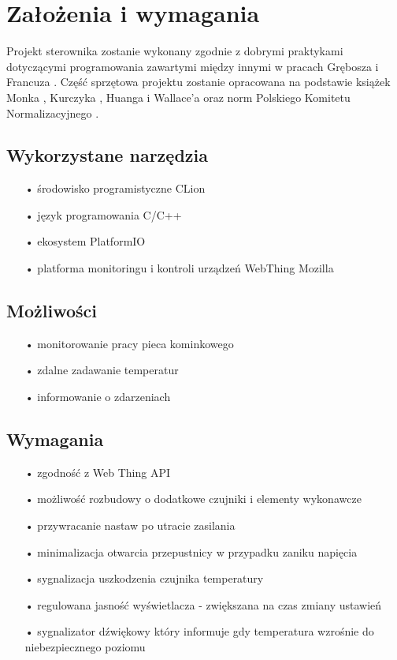 \documentclass[11pt]{report}
\begin{document}
 \section{Założenia i wymagania}
 Projekt sterownika zostanie wykonany zgodnie z dobrymi praktykami dotyczącymi programowania zawartymi między innymi w pracach Grębosza \cite{Grebosz2018} i Francuza \cite{Francuz2015}. Część sprzętowa projektu zostanie opracowana na podstawie książek Monka \cite{Monk2014} \cite{Monk2014a} \cite{Monk2018}, Kurczyka \cite{Kurczyk2019}, Huanga \cite{Huang2018} i Wallace'a \cite{Wallace2019} oraz norm Polskiego Komitetu Normalizacyjnego \cite{PKN1999} \cite{PKN2000}.
 
 \subsection{Wykorzystane narzędzia}
 \begin{enumerate}
 \item[•] środowisko programistyczne CLion
 \item[•] język programowania C/C++
 \item[•] ekosystem PlatformIO
 \item[•] platforma monitoringu i kontroli urządzeń WebThing Mozilla
 \end{enumerate}
 
 \subsection{Możliwości}
 \begin{enumerate}
 \item[•] monitorowanie pracy pieca kominkowego
 \item[•] zdalne zadawanie temperatur
 \item[•] informowanie o zdarzeniach
 \end{enumerate}
 
 \subsection{Wymagania}
 \begin{enumerate}
 \item[•] zgodność z Web Thing API
 \item[•] możliwość rozbudowy o dodatkowe czujniki i elementy wykonawcze
 \item[•] przywracanie nastaw po utracie zasilania
 \item[•] minimalizacja otwarcia przepustnicy w przypadku zaniku napięcia
 \item[•] sygnalizacja uszkodzenia czujnika temperatury
 \item[•] regulowana jasność wyświetlacza - zwiększana na czas zmiany ustawień
 \item[•] sygnalizator dźwiękowy który informuje gdy temperatura wzrośnie do niebezpiecznego poziomu
 \end{enumerate}
 
\end{document}

